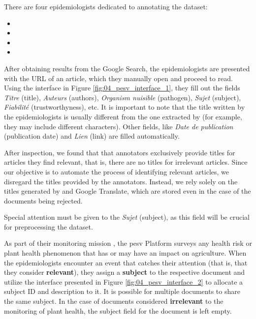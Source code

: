 There are four epidemiologists dedicated to annotating the dataset: 

\begin{itemize}
    \item {}
    \item {}
    \item {}
    \item {}
\end{itemize}


After obtaining results from the Google Search, the epidemiologists are presented with the URL of an article, which they manually open and proceed to read. Using the interface in Figure \ref{fig:04_pesv_interface_1}, they fill out the fields \emph{Titre} (title), \emph{Auteurs} (authors), \emph{Organism nuisible} (pathogen), \emph{Sujet} (subject), \emph{Fiabilité} (trustworthyness), etc. 
It is important to note that the title written by the epidemiologists is usually different from the one extracted by \trafilatura{} (for example, they may include different characters). Other fields, like \emph{Date de publication} (publication date) and \emph{Lien} (link) are filled automatically.

After inspection, we found that that annotators exclusively provide titles for articles they find relevant, that is, there are no titles for irrelevant articles. Since our objective is to automate the process of identifying relevant articles, we disregard the titles provided by the annotators. Instead, we rely solely on the titles generated by \trafilatura{} and Google Translate, which are stored even in the case of the documents being rejected.

Special attention must be given to the \emph{Sujet} (subject), as this field will be crucial for preprocessing the dataset. 

As part of their monitoring mission , the \gls{pesv} Platform surveys any health risk or plant health phenomenon that has or may have an impact on agriculture. 
When the epidemiologists encounter an event that catches their attention (that is, that they consider \textbf{relevant}), they assign a \textbf{subject} to the respective document and utilize the interface presented in Figure \ref{fig:04_pesv_interface_2} to allocate a subject ID and description to it. It is possible for multiple documents to share the same subject. In the case of documents considered \textbf{irrelevant} to the monitoring of plant health, the subject field for the document is left empty.

